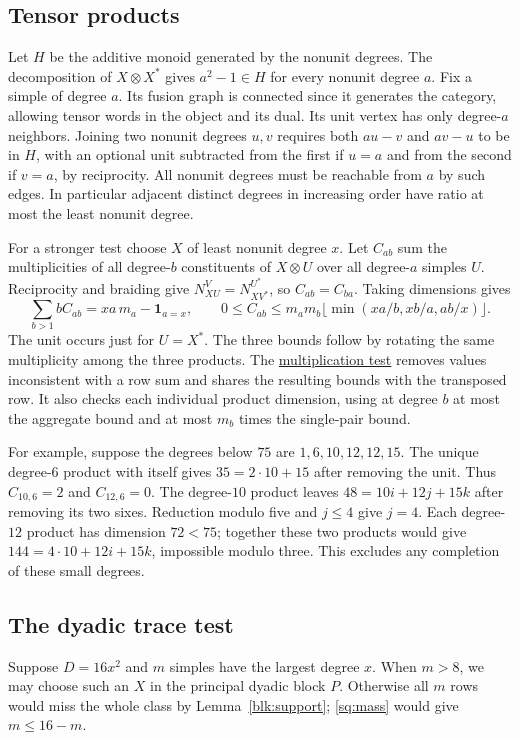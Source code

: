 \documentclass[11pt]{amsart}
\numberwithin{equation}{section}
\newcommand{\supfile}[2]{\href{https://github.com/sebastienpalcoux/WGT-fusion-categories/blob/433d1c45795202991f1693e00d9770e4cccf05f6/papers/rank-bound-supplement/#1}{#2}}
\begin{document}
\subsection{Tensor products}\label{sec:tensor}
Let $H$ be the additive monoid generated by the nonunit degrees.
The decomposition of $X\otimes X^*$ gives $a^2-1\in H$ for every
nonunit degree $a$. Fix a simple of degree $a$. Its fusion graph is
connected since it generates the category, allowing tensor words in
the object and its dual. Its unit vertex has only degree-$a$ neighbors.
Joining two nonunit degrees $u,v$ requires both $au-v$ and $av-u$
to be in $H$, with an optional unit subtracted from the first if $u=a$
and from the second if $v=a$, by reciprocity. All nonunit degrees must
be reachable from $a$ by such edges. In particular adjacent distinct
degrees in increasing order have ratio at most the least nonunit degree.

For a stronger test choose $X$ of least nonunit degree $x$. Let $C_{ab}$
sum the multiplicities of all degree-$b$ constituents of $X\otimes U$
over all degree-$a$ simples $U$. Reciprocity and braiding give
$N_{XU}^V=N_{XV^*}^{U^*}$, so $C_{ab}=C_{ba}$. Taking dimensions gives
\[
  \sum_{b>1}bC_{ab}=xa\,m_a-\mathbf1_{a=x},\qquad
  0\le C_{ab}\le m_am_b
       \lfloor\min(xa/b,xb/a,ab/x)\rfloor .
\]
The unit occurs just for $U=X^*$. The three bounds follow by rotating
the same multiplicity among the three products.
The \supfile{multiplication.py}{multiplication test} removes values
inconsistent with a row sum and shares the resulting bounds with the
transposed row. It also checks each individual product dimension, using
at degree $b$ at most the aggregate bound and at most $m_b$ times the
single-pair bound.

For example, suppose the degrees below $75$ are $1,6,10,12,12,15$.
The unique degree-$6$ product with itself gives
$35=2\cdot10+15$ after removing the unit. Thus $C_{10,6}=2$ and
$C_{12,6}=0$. The degree-$10$ product leaves $48=10i+12j+15k$
after removing its two sixes. Reduction modulo five and $j\le4$ give
$j=4$. Each degree-$12$ product has dimension $72<75$; together these
two products would give $144=4\cdot10+12i+15k$, impossible modulo
three. This excludes any completion of these small degrees.

\subsection{The dyadic trace test}\label{term:dyadic}
Suppose $D=16x^2$ and $m$ simples have the largest degree $x$.
When $m>8$, we may choose such an $X$ in the principal dyadic block
$P$. Otherwise all $m$ rows would miss the whole class by
Lemma~\ref{blk:support}; \eqref{sq:mass} would give $m\le16-m$.
\end{document}
